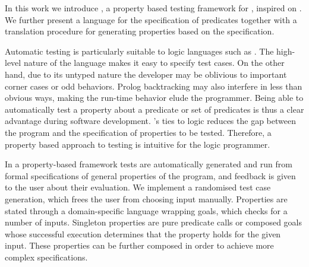 In this work we introduce \plqc{}, a
property based testing framework for \Prolog{}, inspired on
 \QuickCheck \cite{quickcheck}.
%
We further present a language for the specification of \Prolog{} predicates
together with a translation procedure for generating \plqc{} properties
based on the specification.


Automatic testing is particularly suitable to logic languages such as
\Prolog{}. The high-level nature of the language makes it easy to
specify test cases.
%
On the other hand, due to its untyped nature the developer may be
oblivious to important corner cases or odd behaviors.
%
Prolog backtracking may also interfere in less than obvious
ways, making the run-time behavior elude the programmer.
%
Being able to automatically test a property about a predicate or set of
predicates is thus a clear advantage during software development.
%
\Prolog{}'s ties to logic reduces the gap between the program and the
specification of properties to be tested.
%
Therefore, a property based approach to testing is intuitive for the
logic programmer.  


In a property-based framework tests are automatically generated and run from formal specifications of general
properties of the program, and feedback is given to the user about their
evaluation.
%
We implement a randomised test case generation, which frees the user
from choosing input manually.
%
Properties are stated through a domain-specific language wrapping
\Prolog{} goals, which \plqc{} checks for a number of inputs.
%
Singleton properties are pure predicate calls
or composed goals whose successful execution determines that the
property holds for the given input.
%
These properties can be further composed in order to achieve more complex
specifications.




